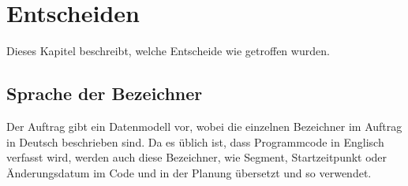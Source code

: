 \chapter{Entscheiden}
Dieses Kapitel beschreibt, welche Entscheide wie getroffen wurden.

\section{Sprache der Bezeichner}
Der Auftrag gibt ein Datenmodell vor, wobei die einzelnen Bezeichner im Auftrag in Deutsch beschrieben sind. Da es üblich ist, dass Programmcode in Englisch verfasst wird, werden auch diese Bezeichner, wie Segment, Startzeitpunkt oder Änderungsdatum im Code und in der Planung übersetzt und so verwendet.